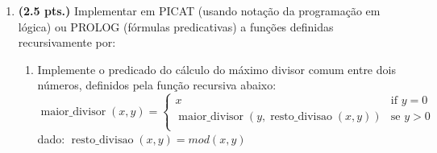 \documentclass[11pt, a4paper,final]{article}
\begin{document}
\begin{enumerate}
\begin{minipage}{0.45\textwidth}
\begin{tiny}
\begin{verbatim}
main => 
       printf("\n\n FIM DOS FATOS \n\n") , true.
\end{verbatim}
\end{tiny}
\end{minipage}
\begin{minipage}{0.45\textwidth}
\begin{tiny}
\begin{center}{\bf PROLOG}\end{center}
\begin{verbatim}

    f1(22).
    f1(24).
	
    f2(1).
    f2(2).
	
    f3(13).
    f3(15).
    
regra( X_1, Y_1, Z_1, Resp ) :-     
      f3(Z_1),
      f1(X_1),
      f2(Y_1),
      Resp is (X_1 + Y_1 + Z_1 ).

main :-     %%% this rule is  backtrackable
   regra(X,Y,Z, R),                            
   writef("\n X: "), write(X),
   writef("\t Y: "), write(Y),
   writef("\t Z: "), write(Z), 
   writef("\t R: "), write(R), 
   false.

main :- 
   writef("\n\n FIM DOS FATOS \n\n") , true.
\end{verbatim}
\end{tiny}
\end{minipage}

\vskip 0.3cm

OBS.: O predicado ``\texttt{false / fail}''  é usado  apenas para forçar o PICAT/PROLOG retornarem todas as respostas usando o ({\em backtracking}). 


\item {\bf (2.5 pts.)} Implementar em PICAT (usando notação da programação em lógica) ou PROLOG (fórmulas predicativas) a funções definidas recursivamente por:
\begin{enumerate}
   \item Implemente o predicado do cálculo do máximo divisor comum entre dois números, definidos pela função recursiva abaixo:\\
  $ \operatorname{maior\_divisor}(x,y) =
  \begin{cases}
 x & \mbox{if } y = 0 \\
\operatorname{maior\_divisor}(y, \operatorname{resto\_divisao}(x,y)) & \mbox{se } y > 0 \\
 \end{cases}
$\\
dado: $\operatorname{resto\_divisao}(x,y) = mod(x,y)$


\end{enumerate}
\end{enumerate}
\end{document}
